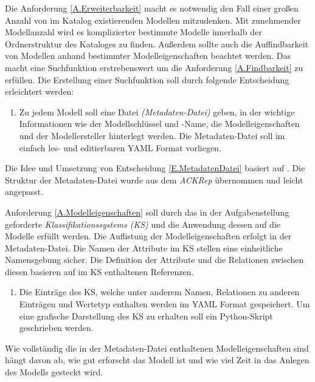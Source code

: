 Die Anforderung \ref{A.Erweiterbarkeit} macht es notwendig den Fall einer großen Anzahl von im Katalog existierenden Modellen mitzudenken. Mit zunehmender Modellanzahl wird es komplizierter bestimmte Modelle innerhalb der Ordnerstruktur des Kataloges zu finden. Außerdem sollte auch die Auffindbarkeit von Modellen anhand bestimmter Modelleigenschaften beachtet werden. Das macht eine Suchfunktion erstrebenswert um die Anforderung \ref{A.Findbarkeit} zu erfüllen. Die Erstellung einer Suchfunktion soll durch folgende Entscheidung erleichtert werden:
\begin{enumerate}[label=\textbf{Entscheidung E.\arabic*}:, ref=\textbf{E.\arabic*}, wide=0pt, leftmargin=*]
	\item \label{E.MetadatenDatei}Zu jedem Modell soll eine Datei \textit{(Metadaten-Datei)} geben, in der wichtige Informationen wie der Modellschlüssel und -Name, die Modelleigenschaften und der Modellersteller hinterlegt werden. Die Metadaten-Datei soll im einfach les- und editierbaren YAML Format vorliegen.
\end{enumerate}
Die Idee und Umsetzung von Entscheidung \ref{E.MetadatenDatei} basiert auf \cite{KNHE20a}. Die Struktur der Metadaten-Datei wurde aus dem \textit{ACKRep} übernommen und leicht angepasst.

Anforderung \ref{A.Modelleigenschaften} soll durch das in der Aufgabenstellung geforderte \textit{Klassifikationssystems (KS)} und die Anwendung dessen auf die Modelle erfüllt werden. Die Auflistung der Modelleigenschaften erfolgt in der Metadaten-Datei. Die Namen der Attribute im KS stellen eine einheitliche Namensgebung sicher. Die Definition der Attribute und die Relationen zwischen diesen basieren auf im KS enthaltenen Referenzen.
\begin{enumerate}[resume*]
	\item Die Einträge des KS, welche unter anderem Namen, Relationen zu anderen Einträgen und Wertetyp enthalten werden im YAML Format gespeichert. Um eine grafische Darstellung des KS zu erhalten soll ein Python-Skript geschrieben werden.
\end{enumerate}
Wie vollständig die in der Metadaten-Datei enthaltenen Modelleigenschaften sind hängt davon ab, wie gut erforscht das Modell ist und wie viel Zeit in das Anlegen des Modells gesteckt wird.


